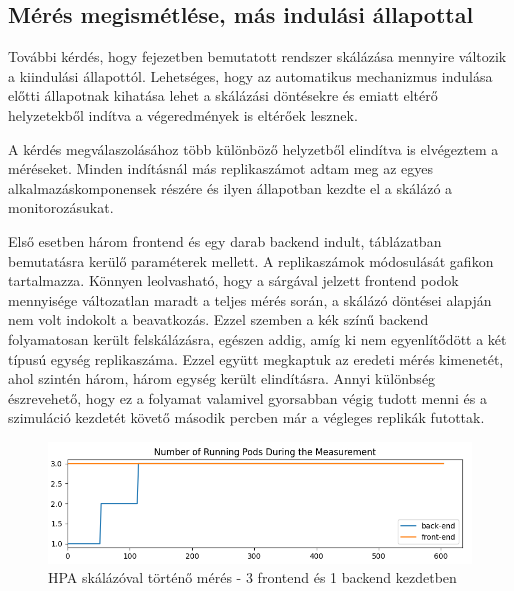 
\subsection{Mérés megismétlése, más indulási állapottal}
További kérdés, hogy  fejezetben bemutatott rendszer skálázása mennyire változik a kiindulási állapottól.
Lehetséges, hogy az automatikus mechanizmus indulása előtti állapotnak kihatása lehet a skálázási döntésekre és emiatt eltérő helyzetekből indítva a végeredmények is eltérőek lesznek.

A kérdés megválaszolásához több különböző helyzetből elindítva is elvégeztem a méréseket. 
Minden indításnál más replikaszámot adtam meg az egyes alkalmazáskomponensek részére és ilyen állapotban kezdte el a skálázó a monitorozásukat.

Első esetben három frontend és egy darab backend indult,  táblázatban bemutatásra kerülő paraméterek mellett.
A replikaszámok módosulását  gafikon tartalmazza.
Könnyen leolvasható, hogy a sárgával jelzett frontend podok mennyisége változatlan maradt a teljes mérés során, a skálázó döntései alapján nem volt indokolt a beavatkozás.
Ezzel szemben a kék színű backend folyamatosan került felskálázásra, egészen addig, amíg ki nem egyenlítődött a két típusú egység replikaszáma.
Ezzel együtt megkaptuk az eredeti mérés kimenetét, ahol szintén három, három egység került elindításra.
Annyi különbség észrevehető, hogy ez a folyamat valamivel gyorsabban végig tudott menni és a szimuláció kezdetét követő második percben már a végleges replikák futottak.

\begin{figure}[!ht]
	\centering
	\includegraphics[width=150mm, keepaspectratio]{figures/HPA-scaling-from-3FE-1BE.png}
	\caption{HPA skálázóval történő mérés - 3 frontend és 1 backend kezdetben}
	\label{fig:HPA-scaling-from-3FE-1BE}
\end{figure}

